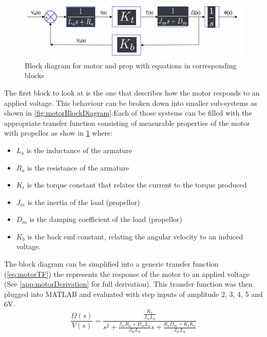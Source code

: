 \documentclass[a4paper, 12pt, compsoc]{IEEEtran}
\begin{document}
        \begin{figure}[]
            \centering
            \includegraphics[width=\columnwidth]{full.png}
            \caption{Block diagram for motor and prop with equations in corresponding blocks \cite{gouws_2008}}
            \label{fig:motorBlockDiagramValues}
        \end{figure}
        The first block to look at is the one that describes how the motor responds to an applied voltage. This behaviour can be broken down into smaller sub-systems as shown in \cref{fig:motorBlockDiagram}.Each of those systems can be filled with the appropriate transfer function consisting of measurable properties of the motor with propellor as show in \cref{fig:motorBlockDiagramValues} where:
        \begin{itemize}
            \item $L_a$ is the inductance of the armature
            \item $R_a$ is the resistance of the armature
            \item $K_t$ is the torque constant that relates the current to the torque produced
            \item $J_m$ is the inertia of the load (propellor)
            \item $D_m$ is the damping coefficient of the load (propellor)
            \item $K_b$ is the back emf constant, relating the angular velocity to an induced voltage.
        \end{itemize}
        
        The block diagram can be simplified into a generic transfer function (\cref{eq:motorTF}) the represents the response of the motor to an applied voltage (See \cref{app:motorDerivation} for full derivation). This transfer function was then plugged into MATLAB and evaluated with step inputs of amplitude 2, 3, 4, 5 and 6V.
        \begin{equation} \label{eq:motorTF}
            \frac{\Omega(s)}{V(s)} = \frac{\frac{K_t}{J_mL_a}}{s^2  + \frac{J_mR_a + D_mL_a}{J_mL_a}s + \frac{R_aD_m+K_tK_b}{J_mL_a}}
        \end{equation}
\end{document}
